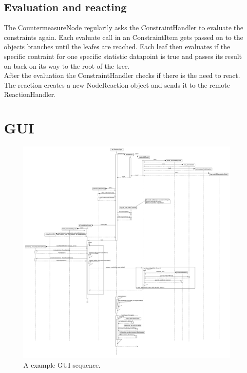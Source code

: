 \subsection*{Evaluation and reacting}
The CountermeasureNode regularily asks the ConstraintHandler to evaluate the constraints again. Each evaluate call in an ConstraintItem gets passed on to the objects branches until the leafes are reached. Each leaf then evaluates if the specific contraint for one specific statistic datapoint is true and passes its result on back on its way to the root of the tree.\\
After the evaluation the ConstraintHandler checks if there is the need to react. The reaction creates a new NodeReaction object and sends it to the remote ReactionHandler.


\newpage
\section{GUI}
\begin{figure}[!ht]
	\begin{center}
		\includegraphics[width=1.0\linewidth]{./diagram_pictures/GUI_seq.pdf}
		\caption{A example GUI sequence.}
	\end{center}
\end{figure}

